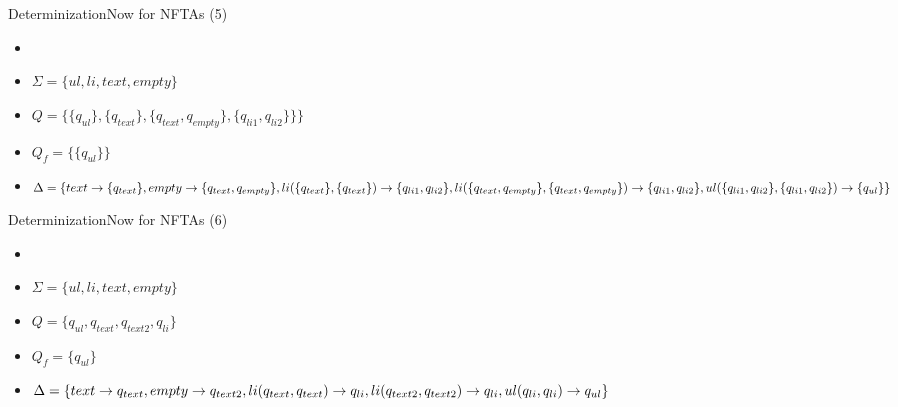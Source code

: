 \documentclass{beamer}
\begin{document}
\begin{frame}{Determinization}{Now for NFTAs (5)}
	\begin{example}
		\begin{itemize}
			\item { 
				\automatonDefinition
			}
			\item {
				\(\Sigma = \{ul, li, text, empty\}\)
			}
			\item {
				\(Q = \{ \{q_{ul}\}, \{q_{text}\},  \{q_{text}, q_{empty}\}, \{q_{li1}, q_{li2}\}\}\}\)
			}
			\item {
				\(Q_f = \{ \{q_{ul}\} \}\)
			}
			\item {
				\(\Delta = \{		text \rightarrow \{q_{text}\},
							\newline
							empty \rightarrow \{q_{text}, q_{empty}\},
							\newline
							li(\{q_{text}\}, \{q_{text}\}) \rightarrow \{q_{li1}, q_{li2}\},		
							\newline
							li(\{q_{text}, q_{empty}\}, \{q_{text}, q_{empty}\}) \rightarrow \{q_{li1}, q_{li2}\},
							\newline
							ul(\{q_{li1}, q_{li2}\}, \{q_{li1}, q_{li2}\}) \rightarrow \{q_{ul}\}
				\}\)
			}
		\end{itemize}
	\end{example}
\end{frame}

\begin{frame}{Determinization}{Now for NFTAs (6)}
	\begin{example}
		\begin{itemize}
			\item { 
				\automatonDefinition
			}
			\item {
				\(\Sigma = \{ul, li, text, empty\}\)
			}
			\item {
				\(Q = \{q_{ul}, q_{text}, q_{text2}, q_{li}\}\)
			}
			\item {
				\(Q_f = \{ q_{ul} \}\)
			}
			\item {
				\(\Delta = \{		text \rightarrow q_{text},
							\newline
							empty \rightarrow q_{text2},
							\newline
							li(q_{text}, q_{text}) \rightarrow q_{li},		
							\newline
							li(q_{text2}, q_{text2}) \rightarrow q_{li},
							\newline
							ul(q_{li}, q_{li}) \rightarrow q_{ul}
				\}\)
			}
		\end{itemize}
	\end{example}
\end{frame}
\end{document}
